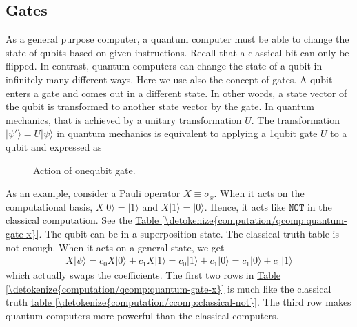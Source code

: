 \documentclass[letterpaper,10pt,english]{jupyterBook}
\begin{document}
\subsection{Gates}
\label{\detokenize{computation/qcomp:gates}}
\sphinxAtStartPar
As a general purpose computer, a quantum computer must be able to change the state of qubits based on given instructions. Recall that a classical bit can only be flipped.  In contrast, quantum computers can change the state of a qubit in infinitely many different ways.  Here we use also the concept of gates.  A qubit enters a gate and comes out in a different state.  In other words, a state vector of the qubit is transformed to another state vector by the gate.  In quantum mechanics, that is achieved by a unitary transformation \(U\).   The transformation \(|\psi'\rangle=U |\psi\rangle\) in quantum mechanics is equivalent to applying a 1\sphinxhyphen{}qubit gate \(U\) to a qubit and expressed as

\begin{figure}[htbp]
\centering
\capstart

\noindent{}
\caption{Action of one\sphinxhyphen{}qubit gate.}\label{\detokenize{computation/qcomp:u1-gate}}\end{figure}

\sphinxAtStartPar
As an example, consider a Pauli operator \(X \equiv \sigma_x\).  When it acts on the computational basis, \(X \lvert 0 \rangle = \lvert 1 \rangle\) and \(X \lvert 1 \rangle=\lvert 0 \rangle\).  Hence, it acts like \(\texttt{NOT}\) in the classical computation. See the \hyperref[\detokenize{computation/qcomp:quantum-gate-x}]{Table \ref{\detokenize{computation/qcomp:quantum-gate-x}}}. The qubit can be in a superposition state.  The  classical truth table is not enough. When it acts on a general state, we get
\begin{equation}\label{equation:computation/qcomp:Xgate}
\begin{split}
X \lvert \psi \rangle = c_0 X \lvert 0 \rangle + c_1 X \lvert 1 \rangle = c_0 \lvert 1 \rangle + c_1 \lvert 0 \rangle = c_1 \lvert 0 \rangle + c_0 \lvert 1 \rangle
\end{split}
\end{equation}
\sphinxAtStartPar
which actually swaps the coefficients.  The first two rows in  \hyperref[\detokenize{computation/qcomp:quantum-gate-x}]{Table \ref{\detokenize{computation/qcomp:quantum-gate-x}}} is much like the classical truth \hyperref[\detokenize{computation/ccomp:classical-not}]{table \ref{\detokenize{computation/ccomp:classical-not}}}.  The third row makes quantum computers more powerful than the classical computers.
\end{document}

